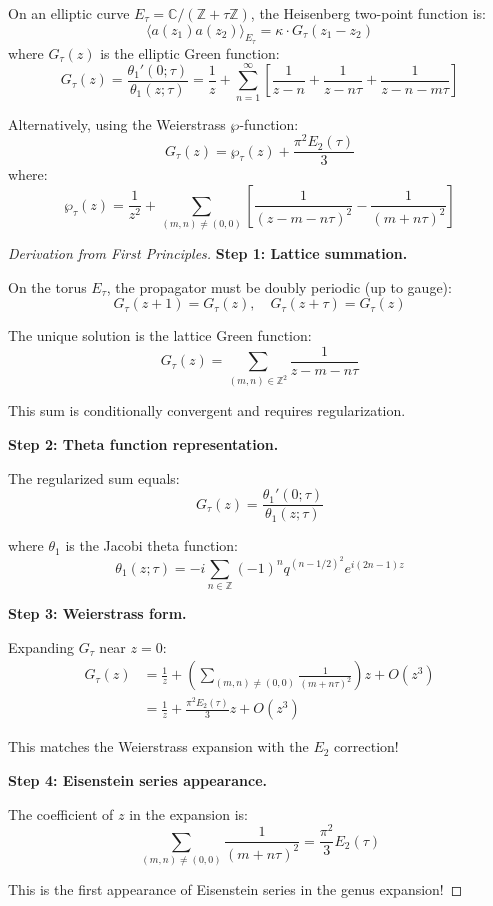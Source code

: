 \begin{theorem}\label{thm:heisenberg-genus-one-complete}
On an elliptic curve $E_\tau = \mathbb{C}/(\mathbb{Z} + \tau\mathbb{Z})$, the 
Heisenberg two-point function is:
\begin{equation}
\langle a(z_1) a(z_2) \rangle_{E_\tau} = \kappa \cdot G_\tau(z_1 - z_2)
\end{equation}
where $G_\tau(z)$ is the elliptic Green function:
\begin{equation}
G_\tau(z) = \frac{\theta_1'(0; \tau)}{\theta_1(z; \tau)} 
= \frac{1}{z} + \sum_{n=1}^{\infty} \left[\frac{1}{z-n} + \frac{1}{z-n\tau} 
+ \frac{1}{z-n-m\tau}\right]
\end{equation}

Alternatively, using the Weierstrass $\wp$-function:
\begin{equation}
G_\tau(z) = \wp_\tau(z) + \frac{\pi^2 E_2(\tau)}{3}
\end{equation}
where:
\begin{equation}
\wp_\tau(z) = \frac{1}{z^2} + \sum_{(m,n) \neq (0,0)} \left[
\frac{1}{(z - m - n\tau)^2} - \frac{1}{(m+n\tau)^2}
\right]
\end{equation}
\end{theorem}

\begin{proof}[Derivation from First Principles]

\textbf{Step 1: Lattice summation.}

On the torus $E_\tau$, the propagator must be doubly periodic (up to gauge):
$$G_\tau(z + 1) = G_\tau(z), \quad G_\tau(z + \tau) = G_\tau(z)$$

The unique solution is the lattice Green function:
$$G_\tau(z) = \sum_{(m,n) \in \mathbb{Z}^2} \frac{1}{z - m - n\tau}$$

This sum is conditionally convergent and requires regularization.

\textbf{Step 2: Theta function representation.}

The regularized sum equals:
$$G_\tau(z) = \frac{\theta_1'(0; \tau)}{\theta_1(z; \tau)}$$

where $\theta_1$ is the Jacobi theta function:
$$\theta_1(z; \tau) = -i \sum_{n \in \mathbb{Z}} (-1)^n q^{(n-1/2)^2} 
e^{i(2n-1)z}$$

\textbf{Step 3: Weierstrass form.}

Expanding $G_\tau$ near $z=0$:
\begin{align}
G_\tau(z) &= \frac{1}{z} + \left(\sum_{(m,n) \neq (0,0)} \frac{1}{(m+n\tau)^2}\right) z 
+ O(z^3) \\
&= \frac{1}{z} + \frac{\pi^2 E_2(\tau)}{3} z + O(z^3)
\end{align}

This matches the Weierstrass expansion with the $E_2$ correction!

\textbf{Step 4: Eisenstein series appearance.}

The coefficient of $z$ in the expansion is:
$$\sum_{(m,n) \neq (0,0)} \frac{1}{(m+n\tau)^2} = \frac{\pi^2}{3} E_2(\tau)$$

This is the first appearance of Eisenstein series in the genus expansion!
\end{proof}

